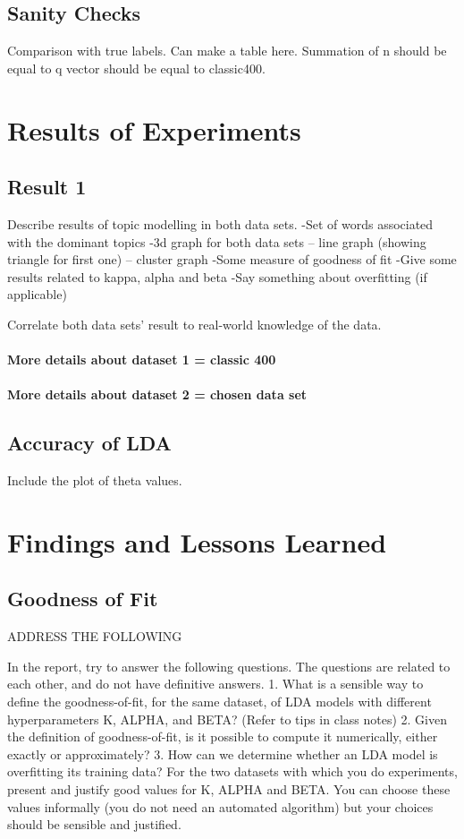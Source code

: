 \documentclass[11pt,a4paper,oneside]{article}
\begin{document}
\subsection{Sanity Checks}
Comparison with true labels. 
Can make a table here.
Summation of n should be equal to q vector should be equal to classic400.

\section{Results of Experiments}
\label{sec:Results}

\subsection{Result 1}
Describe results of topic modelling in both data sets.
-Set of words associated with the dominant topics
-3d graph for both data sets 
	-- line graph (showing triangle for first one)
	-- cluster graph
-Some measure of goodness of fit
-Give some results related to kappa, alpha and beta
-Say something about overfitting (if applicable)

Correlate both data sets' result to real-world knowledge of the data.

\paragraph{More details about dataset 1 = classic 400}
\paragraph{More details about dataset 2 = chosen data set}

\subsection{Accuracy of LDA}
Include the plot of theta values.

\section{Findings and Lessons Learned}

\subsection{Goodness of Fit}
ADDRESS THE FOLLOWING

In the report, try to answer the following questions. The questions are related to each other, and do not have definitive answers.
1. What is a sensible way to define the goodness-of-fit, for the same dataset, of LDA models with different hyperparameters K, ALPHA, and BETA? (Refer to tips in class notes)
2. Given the definition of goodness-of-fit, is it possible to compute it numerically, either exactly or approximately?
3. How can we determine whether an LDA model is overfitting its training data?
For the two datasets with which you do experiments, present and justify good values for K, ALPHA and BETA. You can choose these values informally (you do not need an automated algorithm) but your choices should be sensible and justified.



\end{document}
